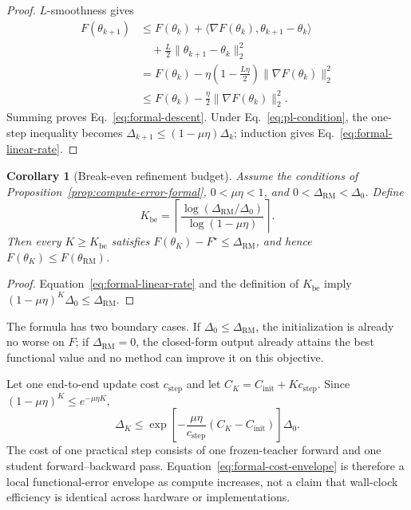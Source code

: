 \documentclass[letterpaper]{article} %
\theoremstyle{plain}
\newtheorem{corollary}[theorem]{Corollary}
\theoremstyle{definition}
\begin{document}
\begin{proof}
$L$-smoothness gives
\begin{align*}
F(\theta_{k+1})
&\le F(\theta_k)
+\langle\nabla F(\theta_k),
  \theta_{k+1}-\theta_k\rangle \\
&\quad +\frac L2
  \|\theta_{k+1}-\theta_k\|_2^2 \\
&=F(\theta_k)-\eta\left(1-\frac{L\eta}{2}\right)
  \|\nabla F(\theta_k)\|_2^2 \\
&\le F(\theta_k)-\frac\eta2
  \|\nabla F(\theta_k)\|_2^2.
\end{align*}
Summing proves Eq.~\eqref{eq:formal-descent}.
Under Eq.~\eqref{eq:pl-condition}, the one-step inequality becomes $\Delta_{k+1}\le(1-\mu\eta)\Delta_k$; induction gives Eq.~\eqref{eq:formal-linear-rate}.
\end{proof}

\begin{corollary}[Break-even refinement budget]
\label{cor:break-even-formal}
Assume the conditions of Proposition~\ref{prop:compute-error-formal}, $0<\mu\eta<1$, and $0<\Delta_{\mathrm{RM}}<\Delta_0$.
Define
\begin{equation}
K_{\mathrm{be}}
=
\left\lceil
\frac{\log(\Delta_{\mathrm{RM}}/\Delta_0)}
     {\log(1-\mu\eta)}
\right\rceil.
\label{eq:formal-break-even}
\end{equation}
Then every $K\ge K_{\mathrm{be}}$ satisfies $F(\theta_K)-F^\star\le\Delta_{\mathrm{RM}}$, and hence $F(\theta_K)\le F(\theta_{\mathrm{RM}})$.
\end{corollary}

\begin{proof}
Equation~\eqref{eq:formal-linear-rate} and the definition of $K_{\mathrm{be}}$ imply $(1-\mu\eta)^K\Delta_0\le\Delta_{\mathrm{RM}}$.
\end{proof}

The formula has two boundary cases.
If $\Delta_0\le\Delta_{\mathrm{RM}}$, the initialization is already no worse on $F$; if $\Delta_{\mathrm{RM}}=0$, the closed-form output already attains the best functional value and no method can improve it on this objective.

Let one end-to-end update cost $c_{\mathrm{step}}$ and let $C_K=C_{\mathrm{init}}+Kc_{\mathrm{step}}$.
Since $(1-\mu\eta)^K\le e^{-\mu\eta K}$,
\begin{equation}
\Delta_K
\le
\exp\!\left[-\frac{\mu\eta}{c_{\mathrm{step}}}
(C_K-C_{\mathrm{init}})\right]\Delta_0.
\label{eq:formal-cost-envelope}
\end{equation}
The cost of one practical step consists of one frozen-teacher forward and one student forward--backward pass.
Equation~\eqref{eq:formal-cost-envelope} is therefore a local functional-error envelope as compute increases, not a claim that wall-clock efficiency is identical across hardware or implementations.
\end{document}
